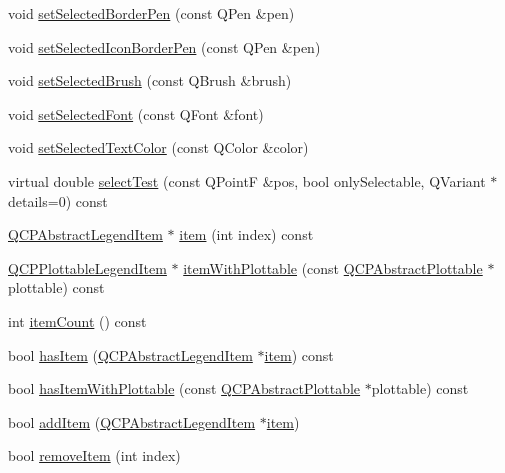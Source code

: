 \begin{DoxyCompactItemize}
void \hyperlink{class_q_c_p_legend_a2c35d262953a25d96b6112653fbefc88}{set\+Selected\+Border\+Pen} (const Q\+Pen \&pen)
\item 
void \hyperlink{class_q_c_p_legend_ade93aabe9bcccaf9cf46cec22c658027}{set\+Selected\+Icon\+Border\+Pen} (const Q\+Pen \&pen)
\item 
void \hyperlink{class_q_c_p_legend_a875227f3219c9799464631dec5e8f1bd}{set\+Selected\+Brush} (const Q\+Brush \&brush)
\item 
void \hyperlink{class_q_c_p_legend_ab580a01c3c0a239374ed66c29edf5ad2}{set\+Selected\+Font} (const Q\+Font \&font)
\item 
void \hyperlink{class_q_c_p_legend_a7674dfc7a1f30e1abd1018c0ed45e0bc}{set\+Selected\+Text\+Color} (const Q\+Color \&color)
\item 
virtual double \hyperlink{class_q_c_p_legend_acd7be544c81324e391cfa6be9c413c01}{select\+Test} (const Q\+PointF \&pos, bool only\+Selectable, Q\+Variant $\ast$details=0) const
\item 
\hyperlink{class_q_c_p_abstract_legend_item}{Q\+C\+P\+Abstract\+Legend\+Item} $\ast$ \hyperlink{class_q_c_p_legend_acfe9694c45104a3359d3806ed366fcf7}{item} (int index) const
\item 
\hyperlink{class_q_c_p_plottable_legend_item}{Q\+C\+P\+Plottable\+Legend\+Item} $\ast$ \hyperlink{class_q_c_p_legend_a91e790002d8bf15a20628a8e8841e397}{item\+With\+Plottable} (const \hyperlink{class_q_c_p_abstract_plottable}{Q\+C\+P\+Abstract\+Plottable} $\ast$plottable) const
\item 
int \hyperlink{class_q_c_p_legend_a57ab86ab8b2a3762d4c1455eb5452c88}{item\+Count} () const
\item 
bool \hyperlink{class_q_c_p_legend_ad0f698e33db454a6c103b5206740e599}{has\+Item} (\hyperlink{class_q_c_p_abstract_legend_item}{Q\+C\+P\+Abstract\+Legend\+Item} $\ast$\hyperlink{class_q_c_p_legend_acfe9694c45104a3359d3806ed366fcf7}{item}) const
\item 
bool \hyperlink{class_q_c_p_legend_a4b90a442af871582df85c2bc13f91e88}{has\+Item\+With\+Plottable} (const \hyperlink{class_q_c_p_abstract_plottable}{Q\+C\+P\+Abstract\+Plottable} $\ast$plottable) const
\item 
bool \hyperlink{class_q_c_p_legend_a3ab274de52d2951faea45a6d975e6b3f}{add\+Item} (\hyperlink{class_q_c_p_abstract_legend_item}{Q\+C\+P\+Abstract\+Legend\+Item} $\ast$\hyperlink{class_q_c_p_legend_acfe9694c45104a3359d3806ed366fcf7}{item})
\item 
bool \hyperlink{class_q_c_p_legend_ac91595c3eaa746fe6321d2eb952c63bb}{remove\+Item} (int index)

\end{DoxyCompactItemize}
